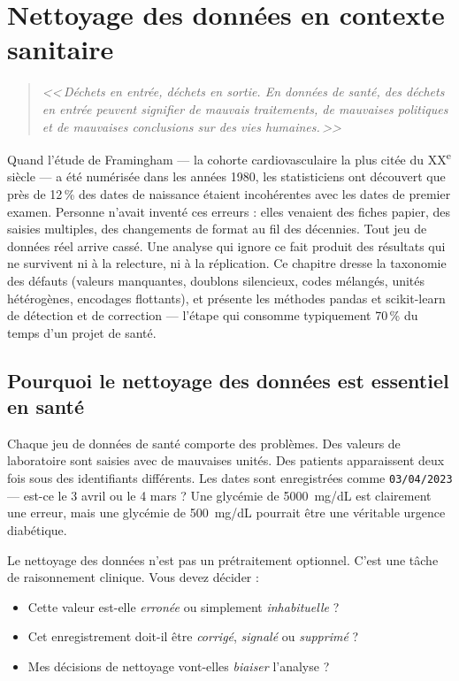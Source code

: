 \chapter{Nettoyage des donn\'ees en contexte sanitaire}
\label{ch:nettoyage-donnees}

\begin{quote}
\emph{<<\,D\'echets en entr\'ee, d\'echets en sortie. En donn\'ees de sant\'e, des d\'echets en entr\'ee peuvent signifier de mauvais traitements, de mauvaises politiques et de mauvaises conclusions sur des vies humaines.\,>>}
\end{quote}

Quand l'étude de Framingham --- la cohorte cardiovasculaire la plus citée du XX\textsuperscript{e} siècle --- a été numérisée dans les années 1980, les statisticiens ont découvert que près de 12\,\% des dates de naissance étaient incohérentes avec les dates de premier examen. Personne n'avait inventé ces erreurs : elles venaient des fiches papier, des saisies multiples, des changements de format au fil des décennies. Tout jeu de données réel arrive cassé. Une analyse qui ignore ce fait produit des résultats qui ne survivent ni à la relecture, ni à la réplication. Ce chapitre dresse la taxonomie des défauts (valeurs manquantes, doublons silencieux, codes mélangés, unités hétérogènes, encodages flottants), et présente les méthodes pandas et scikit-learn de détection et de correction --- l'étape qui consomme typiquement 70\,\% du temps d'un projet de santé.

\section{Pourquoi le nettoyage des donn\'ees est essentiel en sant\'e}

Chaque jeu de donn\'ees de sant\'e comporte des probl\`emes. Des valeurs de laboratoire sont saisies avec de mauvaises unit\'es. Des patients apparaissent deux fois sous des identifiants diff\'erents. Les dates sont enregistr\'ees comme \texttt{03/04/2023} --- est-ce le 3 avril ou le 4 mars ? Une glyc\'emie de 5000~mg/dL est clairement une erreur, mais une glyc\'emie de 500~mg/dL pourrait \^etre une v\'eritable urgence diab\'etique.

Le nettoyage des donn\'ees n'est pas un pr\'etraitement optionnel. C'est une t\^ache de raisonnement clinique. Vous devez d\'ecider :
\begin{itemize}
  \item Cette valeur est-elle \emph{erron\'ee} ou simplement \emph{inhabituelle} ?
  \item Cet enregistrement doit-il \^etre \emph{corrig\'e}, \emph{signal\'e} ou \emph{supprim\'e} ?
  \item Mes d\'ecisions de nettoyage vont-elles \emph{biaiser} l'analyse ?
\end{itemize}


